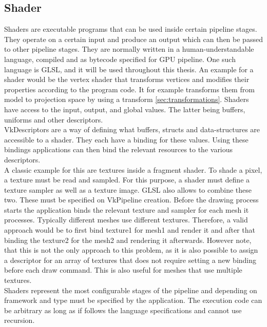 \subsection{Shader}
\label{sec:Shader}
Shaders are executable programs that can be used inside certain pipeline stages. They operate on a certain input and produce an output which can then be passed to other pipeline stages. They are normally written in a human-understandable language, compiled and as bytecode specified for GPU pipeline. One such language is GLSL, and it will be used throughout this thesis. An example for a shader would be the vertex shader that transforms vertices and modifies their properties according to the program code. It for example transforms them from model to projection space by using a transform \ref{sec:transformations}. Shaders have access to the input, output, and global values. The latter being buffers, uniforms and other descriptors.\\
VkDescriptors are a way of defining what buffers, structs and data-structures are accessible to a shader. They each have a binding for these values. Using these bindings applications can then bind the relevant resources to the various descriptors.\\
A classic example for this are textures inside a fragment shader. To shade a pixel, a texture must be read and sampled. For this purpose, a shader must define a texture sampler as well as a texture image. GLSL also allows to combine these two. These must be specified on VkPipeline creation. Before the drawing process starts the application binds the relevant texture and sampler for each mesh it processes. Typically different meshes use different textures. Therefore, a valid approach would be to first bind texture1 for mesh1 and render it and after that binding the texture2 for the mesh2 and rendering it afterwards. However note, that this is not the only approach to this problem, as it is also possible to assign a descriptor for an array of textures that does not require setting a new binding before each draw command. This is also useful for meshes that use multiple textures.\\
Shaders represent the most configurable stages of the pipeline and depending on framework and type must be specified by the application. The execution code can be arbitrary as long as if follows the language specifications and cannot use recursion.
